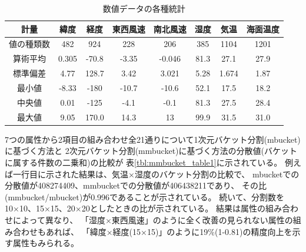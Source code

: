 \begin{table}[hbt]
\begin{center}
\caption{数値データの各種統計}
{\footnotesize
\begin{tabular}{c|c|c|c|c|c|c|c} \hline
計量& 緯度& 経度& 東西風速& 南北風速& 湿度& 気温& 海面温度\\ \hline
値の種類数& 482& 924& 228& 206& 385& 1104& 1201\\
算術平均& 0.305& -70.8& -3.35& -0.046& 81.3& 27.1& 27.9\\
標準偏差& 4.77& 128.7& 3.42& 3.021& 5.28& 1.674& 1.87\\
最小値& -8.33& -180& -10.7& -10.6& 52.1& 17.5& 18.2\\
中央値& 0.01& -125& -4.1& -0.1& 81.3& 27.5& 28.4\\
最大値& 9.05& 170.0& 14.3& 13& 99.9& 31.5& 31.0\\ \hline
\end{tabular}
}
\end{center}
\end{table}

7つの属性から2項目の組み合わせ全21通りについて1次元バケット分割(mbucket)に基づく方法と
2次元バケット分割(mmbucket)に基づく方法の分散値(バケットに属する件数の二乗和)の比較が
表\ref{tbl:mmbucket_table1}に示されている。
例えば一行目に示された結果は、気温×湿度のバケット分割の比較で、
mbucketでの分散値が408274409、mmbucketでの分散値が406438211であり、
その比(mmbucket/mbucket)が0.996であることが示されている。
続いて、分割数を10×10、15×15、20×20としたときの比が示されている。
結果は属性の組み合わせによって異なり、
「湿度×東西風速」のように全く改善の見られない属性の組み合わせもあれば、
「緯度×経度(15×15)」のように19\%(1-0.81)の精度向上を示す属性もみられる。
 
